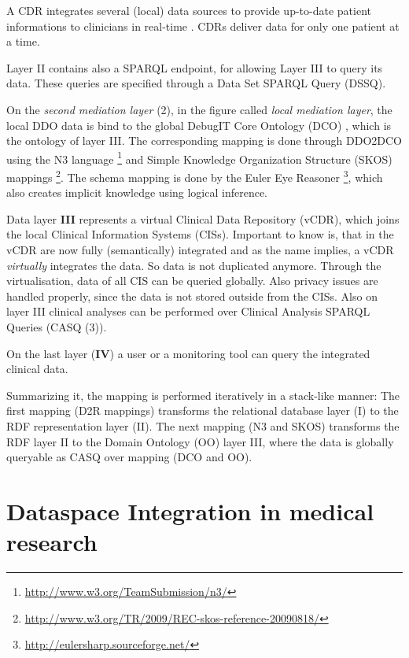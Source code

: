 A CDR integrates several (local) data sources to provide up-to-date patient informations to clinicians in real-time \cite[p. 82]{carter2008electronic}. CDRs deliver data for only one patient at a time.

Layer II contains also a SPARQL endpoint, for allowing Layer III to query its data. These queries are specified through a Data Set SPARQL Query (DSSQ). 

On the \emph{second mediation layer} (2), in the figure called \emph{local mediation layer}, the local DDO data is bind to the global DebugIT Core Ontology (DCO) \cite{Schober_developingdco:}, which is the ontology of layer III. The corresponding mapping is done through DDO2DCO using the N3 language \footnote{\url{http://www.w3.org/TeamSubmission/n3/}} and Simple Knowledge Organization Structure (SKOS) mappings \footnote{\url{http://www.w3.org/TR/2009/REC-skos-reference-20090818/}}. The schema mapping is done by the Euler Eye Reasoner \footnote{\url{http://eulersharp.sourceforge.net/}}, which also creates implicit knowledge using logical inference.

Data layer \textbf{III} represents a virtual Clinical Data Repository (vCDR), which joins the local Clinical Information Systems (CISs). Important to know is, that in the vCDR are now fully (semantically) integrated and as the name implies, a vCDR \emph{virtually} integrates the data. So data is not duplicated anymore. Through the virtualisation, data of all CIS can be queried globally. Also privacy issues are handled properly, since the data is not stored outside from the CISs.
Also on layer III clinical analyses can be performed over Clinical Analysis SPARQL Queries (CASQ (3)). 

On the last layer (\textbf{IV}) a user or a monitoring tool can query the integrated clinical data.

Summarizing it, the mapping is performed iteratively in a stack-like manner:
The first mapping \textalpha (D2R mappings) transforms the relational database layer (I) to the RDF representation layer (II). The next mapping \textbeta (N3 and SKOS) transforms the RDF layer II to the Domain Ontology (OO) layer III, where the data is globally queryable as CASQ over mapping \textgamma (DCO and OO).  

\section{Dataspace Integration in medical research}

